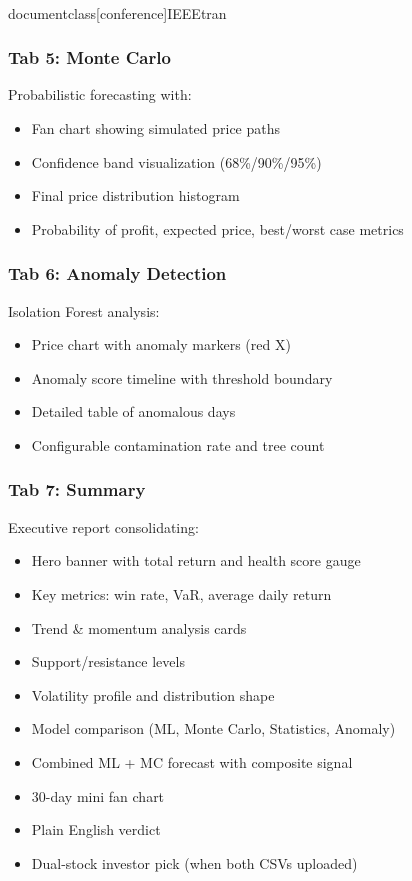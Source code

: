 \\documentclass[conference]{IEEEtran}
\begin{document}
\subsubsection{Tab 5: Monte Carlo}
Probabilistic forecasting with:
\begin{itemize}
    \item Fan chart showing simulated price paths
    \item Confidence band visualization (68\%/90\%/95\%)
    \item Final price distribution histogram
    \item Probability of profit, expected price, best/worst case metrics
\end{itemize}

\subsubsection{Tab 6: Anomaly Detection}
Isolation Forest analysis:
\begin{itemize}
    \item Price chart with anomaly markers (red X)
    \item Anomaly score timeline with threshold boundary
    \item Detailed table of anomalous days
    \item Configurable contamination rate and tree count
\end{itemize}

\subsubsection{Tab 7: Summary}
Executive report consolidating:
\begin{itemize}
    \item Hero banner with total return and health score gauge
    \item Key metrics: win rate, VaR, average daily return
    \item Trend \& momentum analysis cards
    \item Support/resistance levels
    \item Volatility profile and distribution shape
    \item Model comparison (ML, Monte Carlo, Statistics, Anomaly)
    \item Combined ML + MC forecast with composite signal
    \item 30-day mini fan chart
    \item Plain English verdict
    \item Dual-stock investor pick (when both CSVs uploaded)
\end{itemize}
\end{document}
